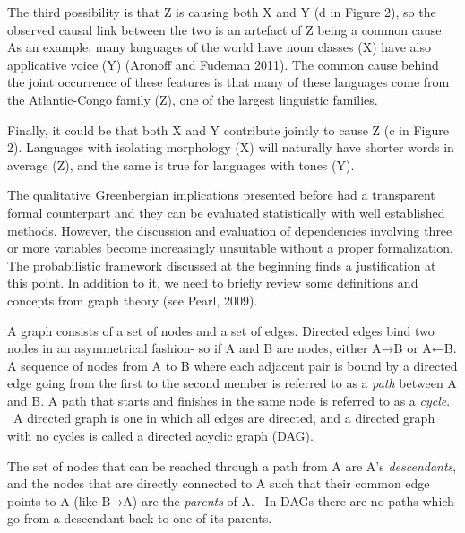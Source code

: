 \documentclass[11pt]{article}
\newenvironment{styleStandard}{\setlength\leftskip{0in}\setlength\rightskip{0in}\setlength\parindent{0in}\setlength\parfillskip{0pt plus 1fil}\setlength\parskip{0in plus 1pt}\writerlistparindent\writerlistleftskip\leavevmode\normalfont\normalsize\writerlistlabel\ignorespaces}{\unskip\vspace{0in plus 1pt}\par}
\newcommand\writerlistleftskip{}
\newcommand\writerlistparindent{}
\newcommand\writerlistlabel{}
\begin{document}
\begin{styleStandard}
The third possibility is that Z is causing both X and Y (d in Figure 2), so the observed causal link between the two is an artefact of Z being a common cause. As an example, many languages of the world have noun classes (X) have also applicative voice (Y) (Aronoff and Fudeman 2011). The common cause behind the joint occurrence of these features is that many of these languages come from the Atlantic-Congo family (Z), one of the largest linguistic families.
\end{styleStandard}


\begin{styleStandard}
Finally, it could be that both X and Y contribute jointly to cause Z (c in Figure 2). Languages with isolating morphology (X) will naturally have shorter words in average (Z), and the same is true for languages with tones (Y).
\end{styleStandard}


\begin{styleStandard}
The qualitative Greenbergian implications presented before had a transparent formal counterpart and they can be evaluated statistically with well established methods. However, the discussion and evaluation of dependencies involving three or more variables become increasingly unsuitable without a proper formalization. The probabilistic framework discussed at the beginning finds a justification at this point. In addition to it, we need to briefly review some definitions and concepts from graph theory (see Pearl, 2009).
\end{styleStandard}


\begin{styleStandard}
A graph consists of a set of nodes and a set of edges. Directed edges bind two nodes in an asymmetrical fashion- so if A and B are nodes, either A→B or A←B. A sequence of nodes from A to B where each adjacent pair is bound by a directed edge going from the first to the second member is referred to as a \textit{path} between A and B. A path that starts and finishes in the same node is referred to as a \textit{cycle}. \ A directed graph is one in which all edges are directed, and a directed graph with no cycles is called a directed acyclic graph (DAG).
\end{styleStandard}


\begin{styleStandard}
The set of nodes that can be reached through a path from A are A’s \textit{descendants},\textit{ }and the nodes that are directly connected to A such that their common edge points to A (like B→A) are the \textit{parents} of A. \ In DAGs there are no paths which go from a descendant back to one of its parents. 
\end{styleStandard}
\end{document}
